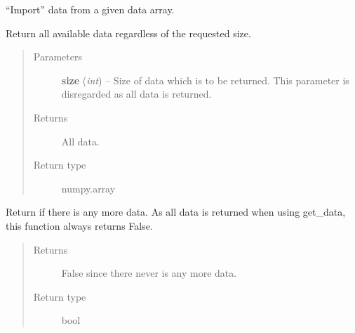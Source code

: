\documentclass[letterpaper,10pt,english]{sphinxmanual}
\begin{document}
\begin{fulllineitems}
\label{common:common_data_importer.CommonSimpleDataImporter}
``Import'' data from a given data array.

\begin{fulllineitems}
\label{common:common_data_importer.CommonSimpleDataImporter.get_data}
Return all available data regardless of the requested size.
\begin{quote}\begin{description}
\item[{Parameters}] \leavevmode
\textbf{size} (\emph{int}) -- Size of data which is to be returned. This parameter is disregarded as all data is returned.

\item[{Returns}] \leavevmode
All data.

\item[{Return type}] \leavevmode
numpy.array

\end{description}\end{quote}

\end{fulllineitems}


\begin{fulllineitems}
\label{common:common_data_importer.CommonSimpleDataImporter.has_more_data}
Return if there is any more data. As all data is returned when using get\_data, this function always returns
False.
\begin{quote}\begin{description}
\item[{Returns}] \leavevmode
False since there never is any more data.

\item[{Return type}] \leavevmode
bool

\end{description}\end{quote}

\end{fulllineitems}


\end{fulllineitems}
\end{document}
